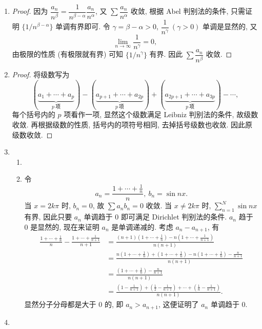 \documentclass[a4paper, 11pt]{ctexart}
\begin{document}
\begin{enumerate}
\begin{proof}
            令 $n\to\infty$, 显然等式右边趋于 $0$. 这里用到了 $\lim\limits_{n\to\infty}a_n = l$ 有 $\lim\limits_{n\to\infty}\dfrac{a_1 + a_2 + \cdots + a_n}{n} = l$ 这个事实.
        \end{proof}
    \item %
        \begin{proof}
            因为 $\dfrac{a_n}{n^\beta} = \dfrac{1}{n^{\beta-\alpha}}\dfrac{a_n}{n^\alpha}$, 又 $\sum\dfrac{a_n}{n^\alpha}$ 收敛, 根据 Abel 判别法的条件, 只需证明 $\{1/n^{\beta-\alpha}\}$ 单调有界即可.
            令 $\gamma = \beta - \alpha > 0$, $\dfrac{1}{n^\gamma}\ (\gamma > 0)$ 单调是显然的, 又
            \[
                \lim_{n\to\infty}\frac{1}{n^\gamma} = 0,
            \]
            由极限的性质 (有极限就有界) 可知 $\{1/n^\gamma\}$ 有界. 因此 $\sum\dfrac{a_n}{n^\beta}$ 收敛.
        \end{proof}
    \item %
        \begin{proof}
            将级数写为
            \[
                (\underbrace{a_1+\cdots+a_p}_{p\ \text{项}})-(\underbrace{a_{p+1}+\cdots+a_{2p}}_{p\ \text{项}})+(\underbrace{a_{2p+1}+\cdots+a_{3p}}_{p\ \text{项}})-\cdots,    
            \]
            每个括号内的 $p$ 项看作一项, 显然这个级数满足 Leibniz 判别法的条件, 故级数收敛.
            再根据级数的性质, 括号内的项符号相同, 去掉括号级数也收敛. 因此原级数收敛.
        \end{proof}
    \item %
        \begin{enumerate}[(1)]
            \item %
            \item %
                令
                \[
                    a_n = \frac{1 + \cdots + \frac1n}{n},\ b_n = \sin nx.    
                \]
                当 $x = 2k\pi$ 时, $b_n = 0$, 故 $\sum a_nb_n = 0$ 收敛.
                当 $x \neq 2k\pi$ 时, $\sum_{n=1}^N\sin nx$ 有界, 因此只要 $a_n$ 单调趋于 $0$ 即可满足 Dirichlet 判别法的条件.
                $a_n$ 趋于 $0$ 是显然的, 现在来证明 $a_n$ 是单调递减的. 考虑 $a_n - a_{n+1}$, 有
                \begin{align*}
                    \frac{1 + \cdots + \frac1n}{n} - \frac{1 + \cdots + \frac{1}{n+1}}{n+1} &= \frac{(n+1)(1+\cdots+\frac1n)-n(1+\cdots+\frac{1}{n+1})}{n(n+1)} \\
                    &= \frac{n(1+\cdots+\frac1n)+(1+\cdots+\frac1n)-n(1+\cdots+\frac1n)-\frac{n}{n+1}}{n(n+1)} \\
                    &= \frac{(1+\cdots+\frac1n)-\frac{n}{n+1}}{n(n+1)} \\
                    &= \frac{(1-\frac{1}{n+1})+(\frac12-\frac{1}{n+1})+\cdots+(\frac1n-\frac{1}{n+1})}{n(n+1)}.  
                \end{align*}
                显然分子分母都是大于 $0$ 的, 即 $a_n > a_{n+1}$, 这便证明了 $a_n$ 单调趋于 $0$.
        \end{enumerate}
    \item %
\end{enumerate}
\end{document}
